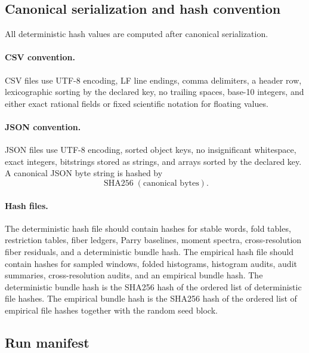 \subsection{Canonical serialization and hash convention}

All deterministic hash values are computed after canonical serialization.

\paragraph{CSV convention.}
CSV files use UTF-8 encoding, LF line endings, comma delimiters, a header row, lexicographic sorting by the declared key, no trailing spaces, base-10 integers, and either exact rational fields or fixed scientific notation for floating values.

\paragraph{JSON convention.}
JSON files use UTF-8 encoding, sorted object keys, no insignificant whitespace, exact integers, bitstrings stored as strings, and arrays sorted by the declared key.  A canonical JSON byte string is hashed by
\[
\operatorname{SHA256}(\text{canonical bytes}).
\]

\paragraph{Hash files.}
The deterministic hash file should contain hashes for stable words, fold tables, restriction tables, fiber ledgers, Parry baselines, moment spectra, cross-resolution fiber residuals, and a deterministic bundle hash.  The empirical hash file should contain hashes for sampled windows, folded histograms, histogram audits, audit summaries, cross-resolution audits, and an empirical bundle hash.  The deterministic bundle hash is the SHA256 hash of the ordered list of deterministic file hashes.  The empirical bundle hash is the SHA256 hash of the ordered list of empirical file hashes together with the random seed block.

\subsection{Run manifest}

